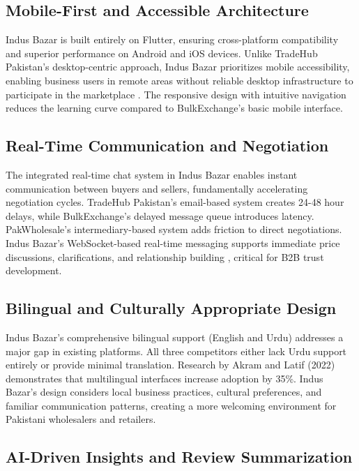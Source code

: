 \subsection{Mobile-First and Accessible Architecture}

Indus Bazar is built entirely on Flutter, ensuring cross-platform compatibility and superior performance on Android and iOS devices. Unlike TradeHub Pakistan's desktop-centric approach, Indus Bazar prioritizes mobile accessibility, enabling business users in remote areas without reliable desktop infrastructure to participate in the marketplace \cite{farooq2024mobile}. The responsive design with intuitive navigation reduces the learning curve compared to BulkExchange's basic mobile interface.

\subsection{Real-Time Communication and Negotiation}

The integrated real-time chat system in Indus Bazar enables instant communication between buyers and sellers, fundamentally accelerating negotiation cycles. TradeHub Pakistan's email-based system creates 24-48 hour delays, while BulkExchange's delayed message queue introduces latency. PakWholesale's intermediary-based system adds friction to direct negotiations. Indus Bazar's WebSocket-based real-time messaging supports immediate price discussions, clarifications, and relationship building \cite{ali2022ecommerce}, critical for B2B trust development.

\subsection{Bilingual and Culturally Appropriate Design}

Indus Bazar's comprehensive bilingual support (English and Urdu) addresses a major gap in existing platforms. All three competitors either lack Urdu support entirely or provide minimal translation. Research by Akram and Latif (2022) \cite{akram2022user} demonstrates that multilingual interfaces increase adoption by 35\%. Indus Bazar's design considers local business practices, cultural preferences, and familiar communication patterns, creating a more welcoming environment for Pakistani wholesalers and retailers.

\subsection{AI-Driven Insights and Review Summarization}

